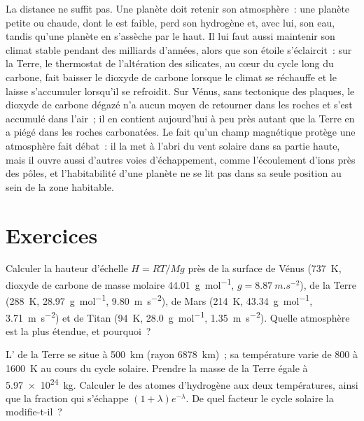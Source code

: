 La distance ne suffit pas. Une planète doit retenir son atmosphère~: une planète
petite ou chaude, dont le  est faible, perd son hydrogène
et, avec lui, son eau, tandis qu'une planète en  s'assèche
par le haut. Il lui faut aussi maintenir son climat stable pendant des milliards
d'années, alors que son étoile s'éclaircit~: sur la Terre, le thermostat de
l'altération des silicates, au cœur du cycle long du carbone, fait baisser le
dioxyde de carbone lorsque le climat se réchauffe et le laisse s'accumuler lorsqu'il
se refroidit. Sur Vénus, sans tectonique des plaques, le dioxyde de carbone dégazé
n'a aucun moyen de retourner dans les roches et s'est accumulé dans l'air~; il
en contient aujourd'hui à peu près autant que la Terre en a piégé dans les roches
carbonatées. Le fait qu'un champ magnétique protège une atmosphère fait débat~: il
la met à l'abri du vent solaire dans sa partie haute, mais il ouvre aussi d'autres
voies d'échappement, comme l'écoulement d'ions près des pôles, et l'habitabilité
d'une planète ne se lit pas dans sa seule position au sein de la zone habitable.

\section{Exercices}

\begin{exercise}[$\star$]\label{exo:b3:planetary-atmospheres:1}
Calculer la hauteur d'échelle $H = RT/Mg$ près de la surface de Vénus
(\qty{737}{K}, dioxyde de carbone de masse molaire \qty{44.01}{g.mol^{-1}},
$g = \qty{8.87}{m.s^{-2}}$), de la Terre (\qty{288}{K},
\qty{28.97}{g.mol^{-1}}, \qty{9.80}{m.s^{-2}}), de Mars (\qty{214}{K},
\qty{43.34}{g.mol^{-1}}, \qty{3.71}{m.s^{-2}}) et de Titan (\qty{94}{K},
\qty{28.0}{g.mol^{-1}}, \qty{1.35}{m.s^{-2}}). Quelle atmosphère est la
plus étendue, et pourquoi~?
\end{exercise}

\begin{exercise}[$\star$]\label{exo:b3:planetary-atmospheres:2}
L' de la Terre se situe à \qty{500}{km} (rayon \qty{6878}{km})~; sa
température varie de 800 à \qty{1600}{K} au cours du cycle solaire. Prendre la
masse de la Terre égale à \qty{5.97e24}{kg}. Calculer le 
des atomes d'hydrogène aux deux températures, ainsi que la fraction
qui s'échappe $(1 + \lambda)e^{-\lambda}$. De quel facteur le cycle solaire la modifie-t-il~?
\end{exercise}

